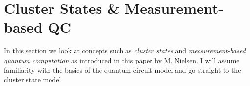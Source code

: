 \documentclass{book}
\theoremstyle{definition}
\begin{document}
%
%
%







\newpage


\section{Cluster States \& Measurement-based QC}


In this section we look at concepts such as \textit{cluster states} and \textit{measurement-based quantum computation} as introduced in this \href{https://arxiv.org/pdf/quant-ph/0504097.pdf}{\underline{paper}} by M. Nielsen. I will assume familiarity with the basics of the quantum circuit model and go straight to the cluster state model.
\end{document}
